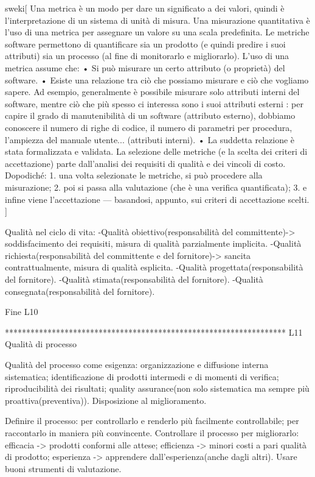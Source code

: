 \documentclass{report}
\begin{document}
sweki[
Una metrica è un modo per dare un significato a dei valori, quindi è l’interpretazione di un sistema di unità di misura. Una misurazione quantitativa è l’uso di una metrica per assegnare un valore su una scala predefinita.
Le metriche software permettono di quantificare sia un prodotto (e quindi predire i suoi attributi) sia un processo (al fine di monitorarlo e migliorarlo).
L’uso di una metrica assume che:
• Si può misurare un certo attributo (o proprietà) del software.
• Esiste una relazione tra ciò che possiamo misurare e ciò che vogliamo sapere.
Ad esempio, generalmente è possibile misurare solo attributi interni del software, mentre ciò che più spesso ci interessa sono i suoi attributi esterni : per capire il grado di manutenibilità di un software (attributo esterno), dobbiamo conoscere il numero di righe di codice, il numero di parametri per procedura, l’ampiezza del manuale utente... (attributi interni).
• La suddetta relazione è stata formalizzata e validata.
La selezione delle metriche (e la scelta dei criteri di accettazione) parte dall’analisi dei requisiti di qualità e dei vincoli di costo. Dopodiché:
1. una volta selezionate le metriche, si può procedere alla misurazione;
2. poi si passa alla valutazione (che è una verifica quantificata);
3. e infine viene l’accettazione — basandosi, appunto, sui criteri di accettazione scelti.
]

Qualità nel ciclo di vita:
-Qualità obiettivo(responsabilità del committente)-> soddisfacimento dei requisiti, misura di qualità parzialmente implicita.
-Qualità richiesta(responsabilità del committente e del fornitore)-> sancita contrattualmente, misura di qualità esplicita.
-Qualità progettata(responsabilità del fornitore).
-Qualità stimata(responsabilità del fornitore).
-Qualità consegnata(responsabilità del fornitore).

Fine L10

******************************************************************
L11 Qualità di processo

Qualità del processo come esigenza: organizzazione e diffusione interna sistematica; identificazione di prodotti intermedi e di momenti di verifica; riproducibilità dei risultati; quality assurance(non solo sistematica ma sempre più proattiva(preventiva)).
Disposizione al miglioramento.

Definire il processo: per controllarlo e renderlo più facilmente controllabile; per raccontarlo in maniera più convincente.
Controllare il processo per migliorarlo: 
efficacia -> prodotti conformi alle attese;
efficienza -> minori costi a pari qualità di prodotto;
esperienza -> apprendere dall'esperienza(anche dagli altri).
Usare buoni strumenti di valutazione.
\end{document}
